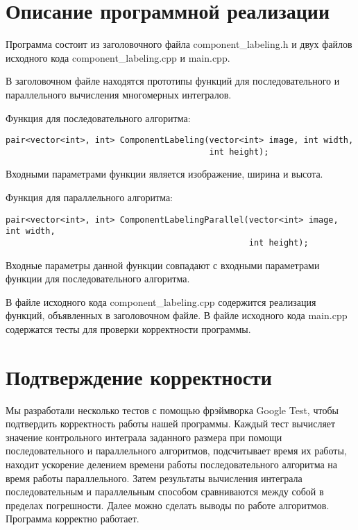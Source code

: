 \documentclass{report}
\begin{document}
\section*{Описание программной реализации}
Программа состоит из заголовочного файла component\_labeling.h и двух файлов исходного кода component\_labeling.cpp и main.cpp.
\par В заголовочном файле находятся прототипы функций для последовательного и параллельного вычисления многомерных интегралов.
\par Функция для последовательного алгоритма:
\begin{lstlisting}
pair<vector<int>, int> ComponentLabeling(vector<int> image, int width,
                                         int height);
\end{lstlisting}
Входными параметрами функции является изображение, ширина и высота.
\par Функция для параллельного
алгоритма:
\begin{lstlisting}
pair<vector<int>, int> ComponentLabelingParallel(vector<int> image, int width,
                                                 int height);
\end{lstlisting}
Входные параметры данной функции совпадают с входными параметрами функции для последовательного алгоритма.
\par В файле исходного кода component\_labeling.cpp содержится реализация функций, объявленных в заголовочном файле. В файле исходного кода main.cpp содержатся тесты для проверки корректности программы.
\newpage

\section*{Подтверждение корректности}
Мы разработали несколько тестов с помощью фрэймворка Google Test, чтобы подтвердить корректность работы нашей программы. Каждый тест вычисляет значение контрольного  интеграла заданного размера при помощи последовательного и параллельного алгоритмов, подсчитывает время их работы, находит ускорение делением времени работы последовательного алгоритма на время работы параллельного. Затем результаты вычисления интеграла последовательным и параллельным способом сравниваются между собой в пределах погрешности. Далее можно сделать выводы по работе алгоритмов. Программа корректно работает.
\newpage
\end{document}
